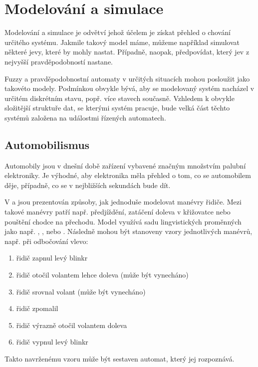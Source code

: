 \documentclass[a4paper,10pt]{article}
\begin{document}
\section{Modelování a simulace}

Modelování a simulace je odvětví jehož účelem je získat přehled o chování určitého systému. Jakmile takový model máme, můžeme například simulovat některé jevy, které by mohly nastat. Případně, naopak, předpovídat, který jev z nejvyšší pravděpodobností nastane.

Fuzzy a pravděpodobnostní automaty v určitých situacích mohou posloužit jako takovéto modely. Podmínkou obvykle bývá, aby se modelovaný systém nacházel v určitém diskrétním stavu, popř. více stavech současně. Vzhledem k obvykle složitější struktuře dat, se kterými systém pracuje, bude velká část těchto systémů založena na událostmi řízených automatech.


\subsection{Automobilismus}
Automobily jsou v dnešní době zařízení vybavené značným množstvím palubní elektroniky. Je výhodné, aby elektronika měla přehled o tom, co se automobilem děje, případně, co se v nejbližších sekundách bude dít.

V \cite{Hul+-ManRecUsProFinStaMacFuzLog} a \cite{TriHei-ExpDesSeqFuzPer} jsou prezentován způsoby, jak jednoduše modelovat manévry řidiče. Mezi takové manévry patří např. předjíždění, zatáčení doleva v křižovatce nebo pouštění chodce na přechodu. Model využívá sadu lingvistických proměnných jako např. , ,  nebo . Následně mohou být stanoveny vzory jednotlivých manévrů, např. při odbočování vlevo:
\begin{enumerate}
 \item řidič zapnul levý blinkr
 \item řidič otočil volantem lehce doleva (může být vynecháno)
 \item řidič srovnal volant (může být vynecháno)
 \item řidič zpomalil
 \item řidič výrazně otočil volantem doleva
 \item řidič vypnul levý blinkr
\end{enumerate}

Takto navrženému vzoru může být sestaven automat, který jej rozpoznává.
\end{document}
